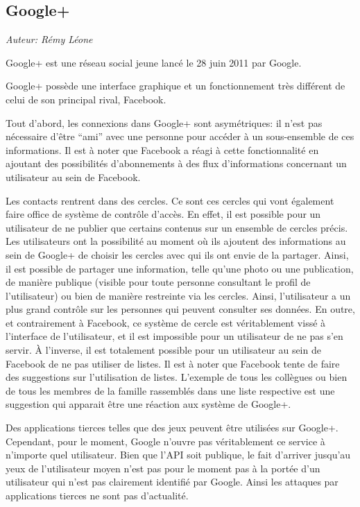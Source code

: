 \subsection{Google+}

\begin{flushright}\textit{Auteur: Rémy Léone}\end{flushright}

Google+ est une réseau social jeune lancé le 28 juin 2011 par Google.
\cite{google-plus-annonce}

Google+ possède une interface graphique et un fonctionnement très différent de
celui de son principal rival, Facebook.

Tout d'abord, les connexions dans Google+ sont asymétriques: il n'est pas
nécessaire d'être ``ami'' avec une personne pour accéder à un sous-ensemble de
ces informations.  Il est à noter que Facebook a réagi à cette fonctionnalité
en ajoutant des possibilités d'abonnements à des flux d'informations concernant
un utilisateur au sein de Facebook. \cite{facebook-subscribe}

Les contacts rentrent dans des cercles. \cite{google+-circles} Ce sont ces
cercles qui vont également faire office de système de contrôle d'accès. En
effet, il est possible pour un utilisateur de ne publier que certains contenus
sur un ensemble de cercles précis. Les utilisateurs ont la possibilité au
moment où ils ajoutent des informations au sein de Google+ de choisir les
cercles avec qui ils ont envie de la partager. Ainsi, il est possible de
partager une information, telle qu'une photo ou une publication, de manière
publique (visible pour toute personne consultant le profil de l'utilisateur) ou
bien de manière restreinte via les cercles. Ainsi, l'utilisateur a un plus
grand contrôle sur les personnes qui peuvent consulter ses données. En outre,
et contrairement à Facebook, ce système de cercle est véritablement vissé à
l'interface de l'utilisateur, et il est impossible pour un utilisateur de ne pas
s'en servir. À l'inverse, il est totalement possible pour un utilisateur au sein
de Facebook de ne pas utiliser de listes.  Il est à noter que Facebook tente
de faire des suggestions sur l'utilisation de
listes. \cite{facebook-smart-lists} L'exemple de tous les collègues ou bien de
tous les membres de la famille rassemblés dans une liste respective est une
suggestion qui apparait être une réaction aux système de Google+.


Des applications tierces telles que des jeux peuvent être utilisées sur
Google+.  Cependant, pour le moment, Google n'ouvre pas véritablement ce
service à n'importe quel utilisateur. Bien que l'API soit publique, le fait
d'arriver jusqu'au yeux de l'utilisateur moyen n'est pas pour le moment pas à
la portée d'un utilisateur qui n'est pas clairement identifié par Google. Ainsi
les attaques par applications tierces ne sont pas d'actualité.
\cite{google-plus-third}

